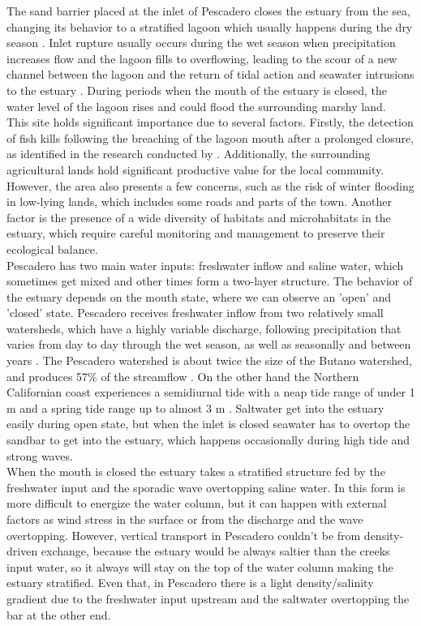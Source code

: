 \documentclass[tesis.tex]{subfiles}
\begin{document}
The sand barrier placed at the inlet of Pescadero closes the estuary from the sea, changing its behavior to a stratified lagoon which usually happens during the dry season \citep{Williams2014}. Inlet rupture usually occurs during the wet season when precipitation increases flow and the lagoon fills to overflowing, leading to the scour of a new channel between the lagoon and the return of tidal action and seawater intrusions to the estuary \citep{largier2015}. During periods when the mouth of the estuary is closed, the water level of the lagoon rises and could flood the surrounding marshy land. \\

This site holds significant importance due to several factors. Firstly, the detection of fish kills following the breaching of the lagoon mouth after a prolonged closure, as identified in the research conducted by \cite{largier2015}. Additionally, the surrounding agricultural lands hold significant productive value for the local community. However, the area also presents a few concerns, such as the risk of winter flooding in low-lying lands, which includes some roads and parts of the town. Another factor is the presence of a wide diversity of habitats and microhabitats in the estuary, which require careful monitoring and management to preserve their ecological balance.\\

Pescadero has two main water inputs: freshwater inflow and saline water, which sometimes get mixed and other times form a two-layer structure. The behavior of the estuary depends on the mouth state, where we can observe an 'open' and 'closed' state. Pescadero receives freshwater inflow from two relatively small watersheds, which have a highly variable discharge, following precipitation that varies from day to day through the wet season, as well as seasonally and between years \citep{largier2015}. The Pescadero watershed is about twice the size of the Butano watershed, and produces 57\% of the streamflow \citep{Williams2014}. On the other hand the Northern Californian coast experiences a semidiurnal tide with a neap tide range of under 1 m and a spring tide range up to almost 3 m \citep{Williams2014}. Saltwater get into the estuary easily during open state, but when the inlet is closed seawater has to overtop the sandbar to get into the estuary, which happens occasionally during high tide and strong waves.\\

When the mouth is closed the estuary takes a stratified structure fed by the freshwater input and the sporadic wave overtopping saline water. In this form is more difficult to energize the water column, but it can happen with external factors as wind stress in the surface or from the discharge and the wave overtopping. However, vertical transport in Pescadero couldn't be from density-driven exchange, because the estuary would be always saltier than the creeks input water, so it always will stay on the top of the water column making the estuary stratified. Even that, in Pescadero there is a light density/salinity gradient due to the freshwater input upstream and the saltwater overtopping the bar at the other end.\\
\end{document}
